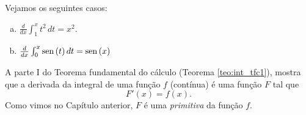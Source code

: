 \cleardoublepage\documentclass[../main.tex]{subfiles}
\begin{document}
\begin{ex}
  Vejamos os seguintes casos:
  \begin{multicols}{2}
  \begin{enumerate}[a)]
  \item
    $
      \frac{d}{dx}\int_1^x t^2\,dt = x^2.
    $
  \item
    $
      \frac{d}{dx}\int_0^x \operatorname{sen}\,(t)\,dt = \operatorname{sen}\,(x)
    $
  \end{enumerate}
  \end{multicols}
\end{ex}

A parte I do Teorema fundamental do cálculo (Teorema \ref{teo:int_tfc1}), mostra que a derivada da integral de uma função $f$ (contínua) é uma função $F$ tal que
\begin{equation}
  F'(x) = f(x).
\end{equation}
Como vimos no Capítulo anterior, $F$ é uma \emph{primitiva} da função $f$.
\end{document}
